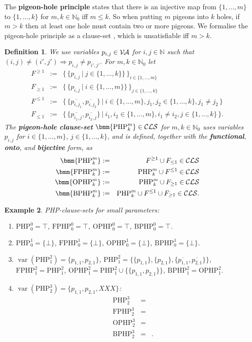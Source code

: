 \documentclass{report}
\newtheorem{defi}{Definition}[section]
\newtheorem{examp}[defi]{Example}
\newcommand{\mb}{{\:|\:}} %
\newcommand{\set}[1]{\{ #1 \}}
\newcommand{\setb}[1]{\big \{ \, #1 \, \big \}}
\newcommand{\tb}[2]{\set{#1, \dots, #2}} %
\newcommand{\ol}{\overline}
\newcommand{\Ra}{\Rightarrow}
\newcommand{\mc}{\mathcal}
\newcommand{\NN}{\mathbb{N}}
\newcommand{\NNZ}{\NN_0}
\newcommand{\Va}{\mc{V\hspace{-0.1em}A}}
\newcommand{\Cls}{\mc{CLS}}
\DeclareMathOperator{\var}{var}
\newcommand{\php}{\mathrm{PHP}}
\newcommand{\fphp}{\mathrm{FPHP}} %
\newcommand{\ophp}{\mathrm{OPHP}} %
\newcommand{\ofphp}{\mathrm{BPHP}} %
\begin{document}
The \textbf{pigeon-hole principle} states that there is an injective map from $\tb1m$ to $\tb1k$ for $m,k \in \NNZ$ iff $m \le k$. So when putting $m$ pigeons into $k$ holes, if $m > k$ then at least one hole must contain two or more pigeons. We formalise the pigeon-hole principle as a clause-set \bmm{\php^m_k}, which is unsatisfiable iff $m > k$.
\begin{defi}\label{def:php}
  We use variables $p_{i,j} \in \Va$ for $i, j \in \NN$ such that $(i,j) \not= (i',j') \Ra p_{i,j} \not= p_{i',j'}$. For $m, k \in \NNZ$ let
  \begin{eqnarray*}
    F^{\ge 1} & := & \setb{\set{p_{i,j} \mb j \in \tb1k}}_{i \in \tb1m }\\
     F_{\ge 1} & := & \setb{\set{p_{i,j} \mb i \in \tb 1m}}_{j \in \tb 1k }\\
    F^{\le 1} & := & \setb{\set{\ol{p_{i,j_1}},\ol{p_{i,j_2}}} \mb i \in \tb 1m, j_1, j_2 \in \tb 1k, j_1 \not= j_2}\\
    F_{\le 1} & := & \setb{ \set{\ol{p_{i_1,j}},\ol{p_{i_2,j}}} \mb i_1,i_2 \in \tb1m, i_1 \not= i_2, j \in \tb1k }.
  \end{eqnarray*}
  The \textbf{pigeon-hole clause-set} $\bmm{\php^m_k} \in \Cls$ for $m,k \in \NNZ$ uses variables $p_{i,j}$ for $i \in \tb 1m$, $j \in \tb 1k$, and is defined, together with the \textbf{functional}, \textbf{onto}, and \textbf{bijective} form, as
  \begin{eqnarray*}
    \bmm{\php^m_k} & := & F^{\ge 1} \cup F_{\le 1} \in \Cls\\
    \bmm{\fphp^m_k} & := & \php^m_k \cup F^{\le 1} \in \Cls\\
    \bmm{\ophp^m_k} & := & \php^m_k \cup F_{\ge 1} \in \Cls\\
    \bmm{\ofphp^m_k} & := & \php^m_k \cup F^{\le 1} \cup F_{\ge 1} \in \Cls.
  \end{eqnarray*}
\end{defi}

\begin{examp}\label{exp:PHPdef}
  PHP-clause-sets for small parameters:
  \begin{enumerate}
  \item $\php^0_0 = \top$, $\fphp^0_0 = \top$, $\ophp^0_0 = \top$, $\ofphp^0_0 = \top$.
  \item $\php^1_0 = \set{\bot}$, $\fphp^1_0 = \set{\bot}$, $\ophp^1_0 = \set{\bot}$, $\ofphp^1_0 = \set{\bot}$.
  \item $\var(\php^2_1) = \set{p_{1,1},p_{2,1}}$, $\php^2_1 = \set{\set{p_{1,1}}, \set{p_{2,1}}, \set{\ol{p_{1,1}},\ol{p_{2,1}}}}$, $\fphp^2_1 = \php^2_1$, $\ophp^2_1 = \php^2_1 \cup \set{\set{p_{1,1},p_{2,1}}}$, $\ofphp^2_1 = \ophp^2_1$.
  \item $\var(\php^3_2) = \set{p_{1,1},p_{2,1}, XXX}$:
    \begin{eqnarray*}
      \php^3_2 & = &\\
      \fphp^3_2 & = &\\
      \ophp^3_2 & = &\\
      \ofphp^3_2 & = &.
    \end{eqnarray*}
  \end{enumerate}
\end{examp}
\end{document}
